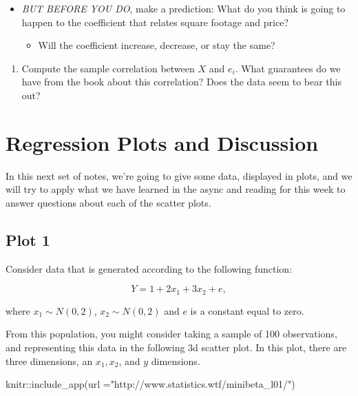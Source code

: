 \documentclass[
]{book}
\newenvironment{Shaded}{\begin{snugshade}}{\end{snugshade}}
\newcommand{\AttributeTok}[1]{\textcolor[rgb]{0.77,0.63,0.00}{#1}}
\newcommand{\FunctionTok}[1]{\textcolor[rgb]{0.00,0.00,0.00}{#1}}
\newcommand{\NormalTok}[1]{#1}
\newcommand{\SpecialCharTok}[1]{\textcolor[rgb]{0.00,0.00,0.00}{#1}}
\newcommand{\StringTok}[1]{\textcolor[rgb]{0.31,0.60,0.02}{#1}}
\providecommand{\tightlist}{%
  \setlength{\itemsep}{0pt}\setlength{\parskip}{0pt}}
\theoremstyle{definition}
\theoremstyle{definition}
\theoremstyle{definition}
\theoremstyle{definition}
\theoremstyle{remark}
\begin{document}
\begin{itemize}
\tightlist
\item
  \emph{BUT BEFORE YOU DO}, make a prediction: What do you think is going to happen to the coefficient that relates square footage and price?

  \begin{itemize}
  \tightlist
  \item
    Will the coefficient increase, decrease, or stay the same?
  \end{itemize}
\end{itemize}

\begin{enumerate}
\def\labelenumi{\arabic{enumi}.}
\setcounter{enumi}{6}
\tightlist
\item
  Compute the sample correlation between \(X\) and \(e_i\). What guarantees do we have from the book about this correlation? Does the data seem to bear this out?
\end{enumerate}

\hypertarget{regression-plots-and-discussion}{%
\section{Regression Plots and Discussion}\label{regression-plots-and-discussion}}

In this next set of notes, we're going to give some data, displayed in plots, and we will try to apply what we have learned in the async and reading for this week to answer questions about each of the scatter plots.

\hypertarget{plot-1}{%
\subsection{Plot 1}\label{plot-1}}

Consider data that is generated according to the following function:

\[
  Y = 1 + 2x_1 + 3x_2 + e, 
\]

where \(x_1 \sim N(0,2)\), \(x_2 \sim N(0,2)\) and \(e\) is a constant equal to zero.

From this population, you might consider taking a sample of 100 observations, and representing this data in the following 3d scatter plot. In this plot, there are three dimensions, an \(x_1, x_2\), and \(y\) dimensions.

\begin{Shaded}
\begin{Highlighting}[]
\NormalTok{knitr}\SpecialCharTok{::}\FunctionTok{include\_app}\NormalTok{(}\AttributeTok{url =}\StringTok{"http://www.statistics.wtf/minibeta\_l01/"}\NormalTok{)}
\end{Highlighting}
\end{Shaded}
\end{document}
